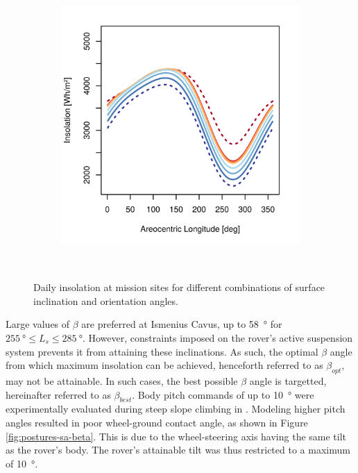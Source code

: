 \begin{figure}[h]
\begin{subfigure}[t]{\subfigureWidth}
            \includegraphics[height=\graphicsHeight]{sections/mission-sites/plots/ismenius-cavus-solar-insolations-for-different-beta-inclinations.png}
            \label{fig:plot:sub:solar-insolations-for-different-beta-ismenius-cavus}
    \end{subfigure}\\[0.8ex]
    \caption[Daily insolation at mission sites for different combinations of surface inclination and orientation angles]
    {Daily insolation at mission sites for different combinations of surface inclination and orientation angles.}
    \label{fig:plot:solar-insolations-for-different-beta}
\vspace{-2ex}
\end{figure}

Large values of $\beta$ are preferred at Ismenius Cavus, up to \SI{58}{\degree} for $\SI{255}{\degree} \leq L_{s} \leq \SI{285}{\degree}$. However, constraints imposed on the rover's active suspension system prevents it from attaining these inclinations. As such, the optimal $\beta$ angle from which maximum insolation can be achieved, henceforth referred to as $\beta_{opt}$, may not be attainable. In such cases, the best possible $\beta$ angle is targetted, hereinafter referred to as $\beta_{best}$. Body pitch commands of up to \SI{10}{\degree} were experimentally evaluated during steep slope climbing in . Modeling higher pitch angles resulted in poor wheel-ground contact angle, as shown in Figure \ref{fig:postures-sa-beta}. This is due to the wheel-steering axis having the same tilt as the rover's body. The rover's attainable tilt was thus restricted to a maximum of \SI{10}{\degree}.


